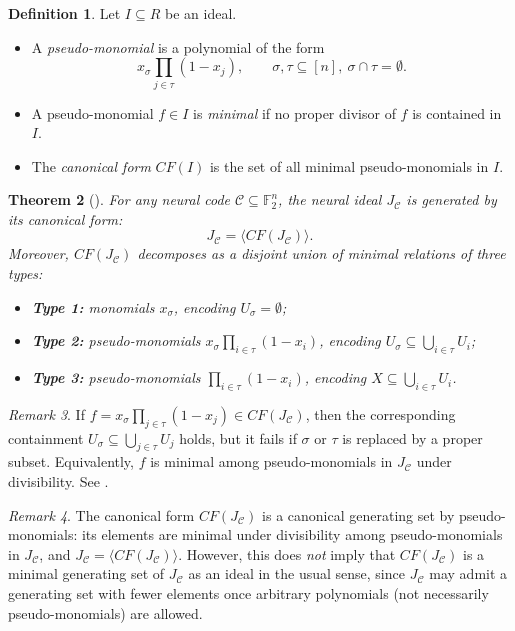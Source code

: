\documentclass[12pt]{amsart}
\newtheorem{theorem}{Theorem}[section]
\theoremstyle{remark}
\newtheorem{remark}[theorem]{Remark}
\theoremstyle{definition}
\newtheorem{definition}[theorem]{Definition}
\newcommand{\F}{\mathbb{F}}
\newcommand{\C}{\mathcal{C}}
\begin{document}
\begin{definition}\label{def:canonical-form}
Let $I\subseteq R$ be an ideal.
\begin{itemize}
\item A \emph{pseudo-monomial} is a polynomial of the form
\[
x_\sigma\prod_{j\in\tau}(1-x_j),
\qquad \sigma,\tau\subseteq[n],\ \sigma\cap\tau=\emptyset.
\]
\item A pseudo-monomial $f\in I$ is \emph{minimal} if no proper divisor of $f$ is contained in $I$.
\item The \emph{canonical form} $CF(I)$ is the set of all minimal pseudo-monomials in $I$.
\end{itemize}
\end{definition}

\begin{theorem}[{\cite[Theorem~4.3]{smb}}]\label{thm:curto_CF}
For any neural code $\C\subseteq\F_2^n$, the neural ideal $J_\C$ is generated by its canonical form:
\[
J_\C=\langle CF(J_\C)\rangle.
\]
Moreover, $CF(J_\C)$ decomposes as a disjoint union of minimal relations of three types:
\begin{itemize}
\item \textbf{Type 1:} monomials $x_\sigma$, encoding $U_\sigma=\emptyset$;
\item \textbf{Type 2:} pseudo-monomials $x_\sigma\prod_{i\in\tau}(1-x_i)$, encoding
$U_\sigma\subseteq \bigcup_{i\in\tau}U_i$;
\item \textbf{Type 3:} pseudo-monomials $\prod_{i\in\tau}(1-x_i)$, encoding
$X\subseteq \bigcup_{i\in\tau}U_i$.
\end{itemize}
\end{theorem}



\begin{remark}\label{rem:minimal_rf}
If $f=x_\sigma\prod_{j\in\tau}(1-x_j)\in CF(J_\C)$, then the corresponding containment
$U_\sigma\subseteq \bigcup_{j\in\tau}U_j$ holds, but it fails if $\sigma$ or $\tau$ is replaced by a
proper subset. Equivalently, $f$ is minimal among pseudo-monomials in $J_\C$ under divisibility.
See \cite[Theorem~4.3]{smb}.
\end{remark}

\begin{remark}\label{rem:CF-not-minimal}
The canonical form $CF(J_\C)$ is a canonical generating set by pseudo-monomials: its elements
are minimal under divisibility among pseudo-monomials in $J_\C$, and $J_\C=\langle CF(J_\C)\rangle$.
However, this does \emph{not} imply that $CF(J_\C)$ is a minimal generating set of $J_\C$ as an ideal
in the usual sense, since $J_\C$ may admit a generating set with fewer elements
once arbitrary polynomials (not necessarily pseudo-monomials) are allowed.
\end{remark}
\end{document}

